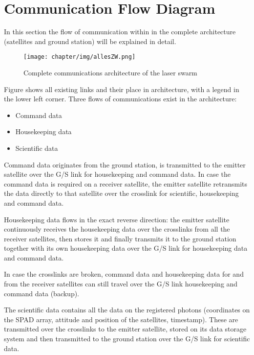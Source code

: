 \section{Communication Flow Diagram}

In this section the flow of communication within in the complete architecture (satellites and ground station) will be explained in detail.
\begin{figure}[ht]
\centering
\texttt{[image: chapter/img/allesZW.png]}
\caption{Complete communications architecture of the laser swarm}
\label{fig:allesZWW}
\end{figure}

Figure \cite{fig:allesZWW} shows all existing links and their place in architecture, with a legend in the lower left corner.
Three flows of communications exist in the architecture:
\begin{itemize}
\item Command data
\item Housekeeping data
\item Scientific data
\end{itemize}

Command data originates from the ground station, is transmitted to the emitter satellite over the G/S link for housekeeping and command data. In case the command data is required on a receiver satellite, the emitter satellite retransmits the data directly to that satellite over the crosslink for scientific, housekeeping and command data.

Housekeeping data flows in the exact reverse direction: the emitter satellite continuously receives the housekeeping data over the crosslinks from all the receiver satellites, then stores it and finally transmits it to the ground station together with its own housekeeping data over the G/S link for housekeeping data and command data.

In case the crosslinks are broken, command data and housekeeping data for and from the receiver satellites can still travel over the G/S link housekeeping and command data (backup).

The scientific data contains all the data on the registered photons (coordinates on the SPAD array, attitude and position of the satellites, timestamp). These are transmitted over the crosslinks to the emitter satellite, stored on its data storage system and then transmitted to the ground station over the G/S link for scientific data.
